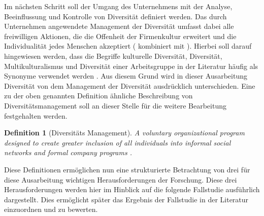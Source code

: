 \documentclass[12pt,a4paper,oneside]{article}
\newtheorem{defi}{Definition}
\newtheorem{satz}{Satz}
\newtheorem{bsp}{Beispiel}
\begin{document}
\begin{titlepage}
\begin{flushleft}
Im nächsten Schritt soll der Umgang des Unternehmens mit der Analyse, Beeinflussung und Kontrolle von Diversität definiert werden. Das durch Unternehmen angewendete Management der Diversität umfasst dabei alle freiwilligen Aktionen, die die Offenheit der Firmenkultur erweitert und die Individualität jedes Menschen akzeptiert (\cite[S. 773]{triandis1994workplace} kombiniert mit \cite[S. 159]{kirton2009costs}). Hierbei soll darauf hingewiesen werden, dass die Begriffe kulturelle Diversität, Diversität, Multikulturalismus und Diversität einer Arbeitsgruppe in der Literatur häufig als Synonyme verwendet werden \cite{ewoh2013}. Aus diesem Grund wird in dieser Ausarbeitung Diversität von dem Management der Diversität ausdrücklich unterschieden. Eine zu der oben genannten Definition ähnliche Beschreibung von Diversitätsmanagement soll an dieser Stelle für die weitere Bearbeitung festgehalten werden.

\begin{defi}[Diversitäts Management]
A voluntary organizational program designed to create greater inclusion of all individuals into informal social networks and formal company programs \cite[S. 61]{gilbert1999dm}.
\end{defi}



Diese Definitionen ermöglichen nun eine strukturierte Betrachtung von drei für diese Ausarbeitung wichtigen Herausforderungen der Forschung. Diese drei Herausforderungen werden hier im Hinblick auf die folgende Fallstudie ausführlich dargestellt. Dies ermöglicht später das Ergebnis der Fallstudie in der Literatur einzuordnen und zu bewerten.


\end{flushleft}
\end{titlepage}
\end{document}
